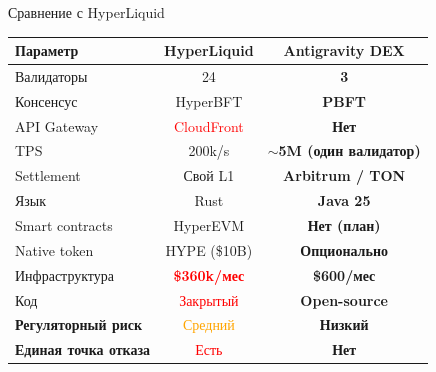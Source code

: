 \documentclass[aspectratio=169]{beamer}
\begin{document}
\begin{frame}{Сравнение с HyperLiquid}

\centering
\begin{tabular}{lcc}
\toprule
\textbf{Параметр} & \textbf{HyperLiquid} & \textbf{Antigravity DEX} \\
\midrule
Валидаторы & 24 & \textbf{3} \\
Консенсус & HyperBFT & \textbf{PBFT} \\
API Gateway & \textcolor{red}{CloudFront} & \textbf{Нет} \\
TPS & 200k/s & \textbf{$\sim$5M (один валидатор)} \\
Settlement & Свой L1 & \textbf{Arbitrum / TON} \\
Язык & Rust & \textbf{Java 25} \\
Smart contracts & HyperEVM & \textbf{Нет (план)} \\
Native token & HYPE (\$10B) & \textbf{Опционально} \\
Инфраструктура & \textcolor{red}{\textbf{\$360k/мес}} & \textbf{\$600/мес} \\
Код & \textcolor{red}{Закрытый} & \textbf{Open-source} \\
\midrule
\textbf{Регуляторный риск} & \textcolor{orange}{Средний} & \textbf{Низкий} \\
\textbf{Единая точка отказа} & \textcolor{red}{Есть} & \textbf{Нет} \\
\bottomrule
\end{tabular}
\end{frame}
\end{document}
